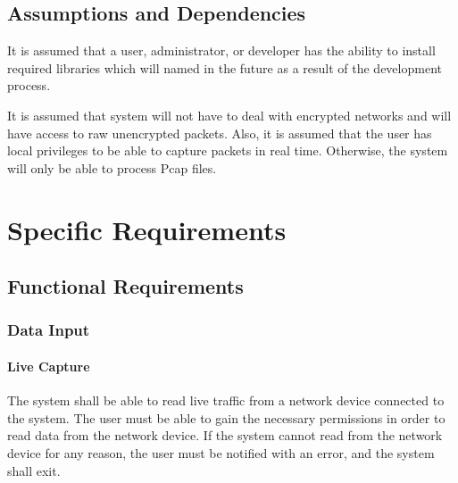 \documentclass[titlepage]{article}
\begin{document}

\subsection{Assumptions and Dependencies%
  \label{assumptions-and-dependencies}%
}

It is assumed that a user, administrator, or developer has the ability to
install required libraries which will named in the future as a result of the
development process.

It is assumed that system will not have to deal with encrypted networks and
will have access to raw unencrypted packets. Also, it is assumed that the user
has local privileges to be able to capture packets in real time. Otherwise, the
system will only be able to process Pcap files.


\section{Specific Requirements%
  \label{specific-requirements}%
}


\subsection{Functional Requirements%
    \label{functional}%
}


\subsubsection{Data Input} \label{data_input}

\paragraph{Live Capture}

The system shall be able to read live traffic from a network device connected
to the system.  The user must be able to gain the necessary permissions in
order to read data from the network device.  If the system cannot read from the
network device for any reason, the user must be notified with an error, and the
system shall exit.
\end{document}
